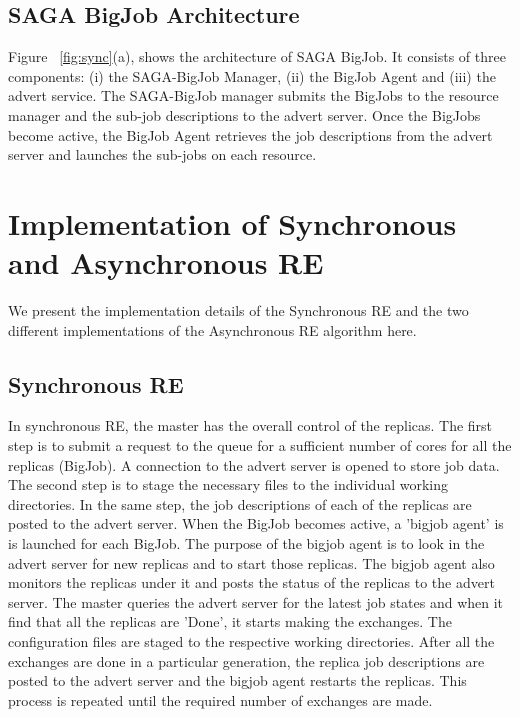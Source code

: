 \documentclass[a4paper,10pt]{article}
\begin{document}
\subsection{SAGA BigJob Architecture}

Figure ~\ref{fig:sync}(a), shows the architecture of SAGA BigJob. It consists of three components: (i) the SAGA-BigJob Manager, (ii) the BigJob Agent and (iii) the advert service. The SAGA-BigJob manager submits the BigJobs to the resource manager and the sub-job descriptions to the advert server. Once the BigJobs become active, the BigJob Agent retrieves the job descriptions from the advert server and launches the sub-jobs on each resource. 

\section{Implementation of Synchronous and Asynchronous RE}
We present the implementation details of the Synchronous RE and the two different implementations of the Asynchronous RE algorithm here.

\subsection{Synchronous RE}

In synchronous RE, the master has the overall control of the replicas. 
The first step is to submit a request to the queue for a sufficient 
number of cores for all the replicas (BigJob). A connection to the 
advert server is opened to store job data. The second step is to 
stage the necessary files to the individual working directories. 
In the same step, the job descriptions of each of the replicas are 
posted to the advert server. When the BigJob becomes active, 
a 'bigjob agent' is is launched for each BigJob. The purpose of 
the bigjob agent is to look in the advert server for new replicas 
and to start those replicas. The bigjob agent also monitors the 
replicas under it and posts the status of the replicas to the advert 
server. The master queries the advert server for the latest job 
states and when it find that all the replicas are 'Done', it 
starts making the exchanges. The configuration files are staged 
to the respective working directories. After all the exchanges 
are done in a particular generation, the replica job descriptions 
are posted to the advert server and the bigjob agent restarts the 
replicas. This process is repeated until the required number of 
exchanges are made. 
\end{document}
